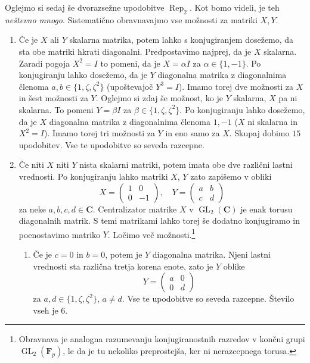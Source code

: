 \documentclass[11pt]{book}
\def\CC{\mathbf{C}}
\def\FF{\mathbf{F}}
\DeclareMathOperator\Rep{Rep}
\DeclareMathOperator\GL{GL}
\theoremstyle{definition}
\theoremstyle{zgled}
\theoremstyle{zgledbrezstevilke}
\theoremstyle{odprtproblem}
\theoremstyle{domacanaloga}
\theoremstyle{izrek}
\begin{document}
Oglejmo si sedaj še dvorazsežne upodobitve $\Rep_2$. Kot bomo videli, je teh \emph{neštevno mnogo}. Sistematično obravnavajmo vse možnosti za matriki $X,Y$. 

\begin{enumerate}
    \item Če je $X$ ali $Y$ skalarna matrika, potem lahko s konjugiranjem dosežemo, da sta obe matriki hkrati diagonalni. Predpostavimo najprej, da je $X$ skalarna. Zaradi pogoja $X^2 = I$ to pomeni, da je $X = \alpha I$ za $\alpha \in \{ 1, -1 \}$. Po konjugiranju lahko dosežemo, da je $Y$ diagonalna matrika z diagonalnima členoma $a, b \in \{ 1, \zeta, \zeta^2 \}$ (upoštevajoč $Y^3 = I$). Imamo torej dve možnosti za $X$ in šest možnosti za $Y$. Oglejmo si zdaj še možnost, ko je $Y$ skalarna, $X$ pa ni skalarna. To pomeni $Y = \beta I$ za $\beta \in \{ 1, \zeta, \zeta^2 \}$. Po konjugiranju lahko dosežemo, da je $X$ diagonalna matrika z diagonalnima členoma $1, -1$ ($X$ ni skalarna in $X^2 = I$). Imamo torej tri možnosti za $Y$ in eno samo za $X$. Skupaj dobimo $15$ upodobitev. Vse te upodobitve so seveda razcepne.

    \item Če niti $X$ niti $Y$ nista skalarni matriki, potem imata obe dve različni lastni vrednosti. Po konjugiranju lahko matriki $X$, $Y$ zato zapišemo v obliki
    \[
        X = \begin{pmatrix}
            1 & 0 \\ 0 & -1
        \end{pmatrix}, \quad
        Y = \begin{pmatrix}
            a & b \\ c & d
        \end{pmatrix}
    \]
    za neke $a,b,c,d \in \CC$. Centralizator matrike $X$ v $\GL_2(\CC)$ je enak torusu diagonalnih matrik. S temi matrikami lahko torej še dodatno konjugiramo in poenostavimo matriko $Y$. Ločimo več možnosti.\footnote{Obravnava je analogna razumevanju konjugiranostnih razredov v končni grupi $\GL_2(\FF_p)$, le da je tu nekoliko preprostejša, ker ni nerazcepnega torusa.}
    \begin{enumerate}
        \item Če je $c = 0$ in $b = 0$, potem je $Y$ diagonalna matrika. 
        Njeni lastni vrednosti sta različna tretja korena enote, zato je $Y$ oblike
        \[
            Y = \begin{pmatrix}
                a & 0 \\ 0 & d
            \end{pmatrix}
        \]
        za $a,d\in \{ 1, \zeta, \zeta^2 \}$, $a \neq d$. Vse te upodobitve so seveda razcepne. Število vseh je $6$.
        

\end{enumerate}
\end{enumerate}
\end{document}
